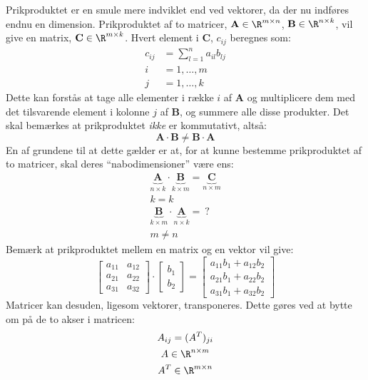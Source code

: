 \documentclass[../SOP.tex]{subfile}
\begin{document}
Prikproduktet er en smule mere indviklet end ved vektorer, da der nu indføres endnu en dimension. Prikproduktet af to matricer, $\mathbf{A}\in\R^{m\times n}$, $\mathbf{B} \in \R^{n \times k}$, vil give en matrix, $\mathbf{C}\in\R^{m\times k}$. Hvert element i $\mathbf{C}$, $c_{ij}$ beregnes som:
\begin{align*}
  c_{ij} &= \sum_{l=1}^n a_{il}b_{lj}\\
  i&=1,\dots,m\\
  j&=1,\dots,k
\end{align*}
Dette kan forstås at tage alle elementer i række $i$ af $\mathbf{A}$ og multiplicere dem med det tilsvarende element i kolonne $j$ af $\mathbf{B}$, og summere alle disse produkter. Det skal bemærkes at prikproduktet \emph{ikke} er kommutativt, altså:
\begin{equation*}
  \mathbf{A}\cdot\mathbf{B}\neq\mathbf{B}\cdot\mathbf{A}
\end{equation*}
En af grundene til at dette gælder er at, for at kunne bestemme prikproduktet af to matricer, skal deres ``nabodimensioner'' være ens:
\begin{gather*}
  \underbrace{\mathbf{A}}_{n\times k}\cdot\underbrace{\mathbf{B}}_{k\times m}=\underbrace{\mathbf{C}}_{n\times m}\\
  k=k\\
  \underbrace{\mathbf{B}}_{k\times m}\cdot\underbrace{\mathbf{A}}_{n\times k}=\ ?\\
  m\neq n
\end{gather*}
Bemærk at prikproduktet mellem en matrix og en vektor vil give:
\begin{equation*}
  \begin{bmatrix}
    a_{11} & a_{12} \\
    a_{21} & a_{22} \\
    a_{31} & a_{32}
  \end{bmatrix}
  \cdot
  \begin{bmatrix}
    b_1 \\ b_2
  \end{bmatrix}
  =
  \begin{bmatrix}
    a_{11}b_1 + a_{12}b_2\\
    a_{21}b_1 + a_{22}b_2 \\
    a_{31}b_1 + a_{32}b_2
  \end{bmatrix}
\end{equation*}
Matricer kan desuden, ligesom vektorer, transponeres. Dette gøres ved at bytte om på de to akser i matricen:
\begin{gather*}
  A_{ij}=(A^T)_{ji}\\
  A\in \R^{n\times m}\\
  A^T \in \R^{m\times n}
\end{gather*}
\end{document}

